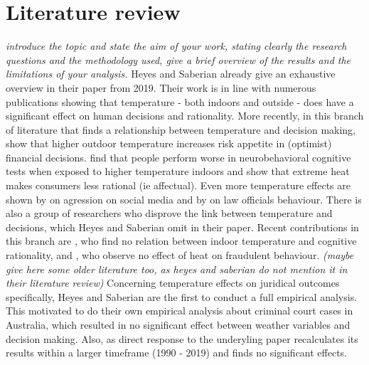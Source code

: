 \documentclass[11pt]{article}
\begin{document}
	\section{Literature review}
	\textit{introduce the topic and state the aim of your work, stating clearly the
		research questions and the methodology used, give a brief overview of the results and the
		limitations of your analysis.}
	Heyes and Saberian already give an exhaustive overview in their paper from 2019. Their work is in line with numerous publications showing that temperature - both indoors and outside - does have a significant effect on human decisions and rationality. More recently, in this branch of literature that finds a relationship between temperature and decision making, \cite{Gavresi.2021} show that higher outdoor temperature increases risk appetite in (optimist) financial decisions. \cite{Chen.2020} find that people perform worse in neurobehavioral cognitive tests when exposed to higher temperature indoors and  \cite{Hadi.2019} show that extreme heat makes consumers less rational (ie affectual). Even more temperature effects are shown by \cite{Stevens.2021} on agression on social media and by \cite{Ryan.2020} on law officials behaviour. \newline
	There is also a group of researchers who disprove the link between temperature and decisions, which Heyes and Saberian omit in their paper. Recent contributions in this branch are \cite{Stroom.2021}, who find no relation between indoor temperature and cognitive rationality, and \cite{Liu.2020}, who observe no effect of heat on fraudulent behaviour. \textit{(maybe give here some older literature too, as heyes and saberian do not mention it in their literature review)} \newline
	Concerning temperature effects on juridical outcomes specifically, Heyes and Saberian are the first to conduct a full empirical analysis. This motivated  \cite{Evans.2021} to do their own empirical analysis about criminal court cases in Australia, which resulted in no significant effect between weather variables and decision making. Also, as direct response to the underyling paper \cite{Spamann.2020} recalculates its results within a larger timeframe (1990 - 2019) and finds no significant effects.
	
\end{document}
